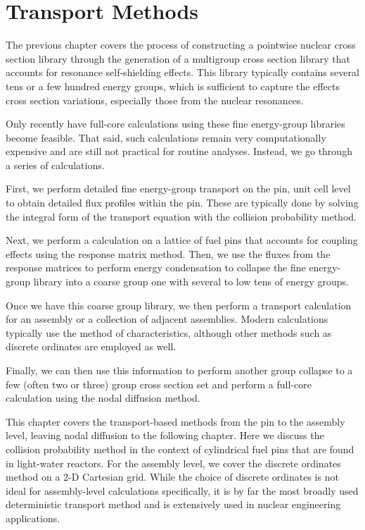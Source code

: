 \chapter{Transport Methods} \label{Sec:transport}

The previous chapter covers the process of constructing a pointwise nuclear cross section library through the generation of a multigroup cross section library that accounts for resonance self-shielding effects. This library typically contains several tens or a few hundred energy groups, which is sufficient to capture the effects cross section variations, especially those from the nuclear resonances.

Only recently have full-core calculations using these fine energy-group libraries become feasible. That said, such calculations remain very computationally expensive and are still not practical for routine analyses. Instead, we go through a series of calculations. 

First, we perform detailed fine energy-group transport on the pin, unit cell level to obtain detailed flux profiles within the pin. These are typically done by solving the integral form of the transport equation with the collision probability method. 

Next, we perform a calculation on a lattice of fuel pins that accounts for coupling effects using the response matrix method. Then, we use the fluxes from the response matrices to perform energy condensation to collapse the fine energy-group library into a coarse group one with several to low tens of energy groups. 

Once we have this coarse group library, we then perform a transport calculation for an assembly or a collection of adjacent assemblies. Modern calculations typically use the method of characteristics, although other methods such as discrete ordinates are employed as well. 

Finally, we can then use this information to perform another group collapse to a few (often two or three) group cross section set and perform a full-core calculation using the nodal diffusion method.

This chapter covers the transport-based methods from the pin to the assembly level, leaving nodal diffusion to the following chapter. Here we discuss the collision probability method in the context of cylindrical fuel pins that are found in light-water reactors. For the assembly level, we cover the discrete ordinates method on a 2-D Cartesian grid. While the choice of discrete ordinates is not ideal for assembly-level calculations specifically, it is by far the most broadly used deterministic transport method and is extensively used in nuclear engineering applications.




